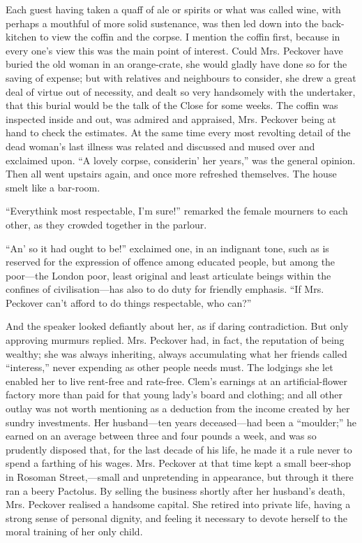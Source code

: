 Each guest having taken a quaff of ale or spirits or what was called
wine, with perhaps a mouthful of more solid sustenance, was then led
down into the back-kitchen to view the coffin and the corpse. I mention
the coffin first, because in every one's view this was the main point of
interest. Could Mrs. Peckover have buried the old woman {}in an
orange-crate, she would gladly have done so for the saving of expense;
but with relatives and neighbours to consider, she drew a great deal of
virtue out of necessity, and dealt so very handsomely with the
undertaker, that this burial would be the talk of the Close for some
weeks. The coffin was inspected inside and out, was admired and
appraised, Mrs. Peckover being at hand to check the estimates. At the
same time every most revolting detail of the dead woman's last illness
was related and discussed and mused over and exclaimed upon. ``A lovely
corpse, considerin' her years,'' was the general opinion. Then all went
upstairs again, and once more refreshed themselves. The house smelt like
a bar-room.

``Everythink most respectable, I'm sure!'' remarked the female mourners
to each other, as they crowded together in the parlour.

``An' so it had ought to be!'' exclaimed one, in an indignant tone, such
as is reserved for the expression of offence among educated people, but
among the poor---the London {}poor, least original and least articulate
beings within the confines of civilisation---has also to do duty for
friendly emphasis. ``If Mrs. Peckover can't afford to do things
respectable, who can?''

And the speaker looked defiantly about her, as if daring contradiction.
But only approving murmurs replied. Mrs. Peckover had, in fact, the
reputation of being wealthy; she was always inheriting, always
accumulating what her friends called ``interess,'' never expending as
other people needs must. The lodgings she let enabled her to live
rent-free and rate-free. Clem's earnings at an artificial-flower factory
more than paid for that young lady's board and clothing; and all other
outlay was not worth mentioning as a deduction from the income created
by her sundry investments. Her husband---ten years deceased---had been a
``moulder;'' he earned on an average between three and four pounds a
week, and was so prudently disposed that, for the last decade of his
life, he made it a rule never to spend a farthing of {}his wages. Mrs.
Peckover at that time kept a small beer-shop in Rosoman Street,---small
and unpretending in appearance, but through it there ran a beery
Pactolus. By selling the business shortly after her husband's death,
Mrs. Peckover realised a handsome capital. She retired into private
life, having a strong sense of personal dignity, and feeling it
necessary to devote herself to the moral training of her only child.

